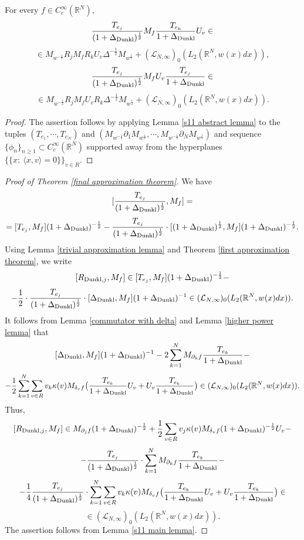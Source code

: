 \documentclass{amsart}
\begin{document}
\begin{lemma}\label{s11 main lemma} For every $f\in C^{\infty}_c(\mathbb{R}^N),$
$$\frac{T_{e_j}}{(1+\Delta_{{\rm Dunkl}})^{\frac12}}M_f\frac{T_{e_k}}{1+\Delta_{{\rm Dunkl}}}U_v\in$$
$$\in M_{w^{-\frac12}}R_jM_fR_kU_v\Delta^{-\frac12}M_{w^{\frac12}}+(\mathcal{L}_{N,\infty})_0(L_2(\mathbb{R}^N,w(x)dx)),$$
$$\frac{T_{e_j}}{(1+\Delta_{{\rm Dunkl}})^{\frac12}}M_fU_v\frac{T_{e_j}}{1+\Delta_{{\rm Dunkl}}}\in $$
$$\in M_{w^{-\frac12}}R_jM_fU_vR_k\Delta^{-\frac12}M_{w^{\frac12}}+(\mathcal{L}_{N,\infty})_0(L_2(\mathbb{R}^N,w(x)dx)).$$
\end{lemma}
\begin{proof} The assertion follows by applying Lemma \ref{s11 abstract lemma} to the tuples $(T_{e_1},\cdots,T_{e_N})$ and $(M_{w^{-\frac12}}\partial_1M_{w^{\frac12}},\cdots,M_{w^{-\frac12}}\partial_NM_{w^{\frac12}})$ and sequence $\{\phi_n\}_{n\geq1}\subset C^{\infty}_c(\mathbb{R}^N)$ supported away from the hyperplanes $\{\{x:\ \langle x,v\rangle=0\}\}_{v\in R}.$
\end{proof}



\begin{proof}[Proof of Theorem \ref{final approximation theorem}] We have
$$[\frac{T_{e_j}}{(1+\Delta_{{\rm Dunkl}})^{\frac12}},M_f]=$$
$$=[T_{e_j},M_f](1+\Delta_{{\rm Dunkl}})^{-\frac12}-\frac{T_{e_j}}{(1+\Delta_{{\rm Dunkl}})^{\frac12}}\cdot [(1+\Delta_{{\rm Dunkl}})^{\frac12},M_f](1+\Delta_{{\rm Dunkl}})^{-\frac12}.$$
Using Lemma \ref{trivial approximation lemma} and Theorem \ref{first approximation theorem}, we write
$$[R_{{\rm Dunkl},j},M_f]\in [T_{e_j},M_f](1+\Delta_{{\rm Dunkl}})^{-\frac12}-$$
$$-\frac12\cdot\frac{T_{e_j}}{(1+\Delta_{{\rm Dunkl}})^{\frac12}}\cdot [\Delta_{{\rm Dunkl}},M_f](1+\Delta_{{\rm Dunkl}})^{-1}\in(\mathcal{L}_{N,\infty})_0(L_2(\mathbb{R}^N,w(x)dx)).$$
It follows from Lemma \ref{commutator with delta} and Lemma \ref{higher power lemma} that
$$[\Delta_{{\rm Dunkl}},M_f](1+\Delta_{{\rm Dunkl}})^{-1}-2\sum_{k=1}^NM_{\partial_kf}\frac{T_{e_k}}{1+\Delta_{{\rm Dunkl}}}-$$
$$-\frac12\sum_{k=1}^N\sum_{v\in R}v_k\kappa(v)M_{\delta_vf}\big(\frac{T_{e_k}}{1+\Delta_{{\rm Dunkl}}}U_v+U_v\frac{T_{e_k}}{1+\Delta_{{\rm Dunkl}}}\big)\in (\mathcal{L}_{N,\infty})_0(L_2(\mathbb{R}^N,w(x)dx)).$$
Thus,
$$[R_{{\rm Dunkl},j},M_f]\in M_{\partial_jf}(1+\Delta_{{\rm Dunkl}})^{-\frac12}+\frac12\sum_{v\in R}v_j\kappa(v)M_{\delta_vf}(1+\Delta_{{\rm Dunkl}})^{-\frac12}U_v-$$
$$-\frac{T_{e_j}}{(1+\Delta_{{\rm Dunkl}})^{\frac12}}\cdot \sum_{k=1}^NM_{\partial_kf}\frac{T_{e_k}}{1+\Delta_{{\rm Dunkl}}}-$$
$$-\frac14\frac{T_{e_j}}{(1+\Delta_{{\rm Dunkl}})^{\frac12}}\cdot\sum_{k=1}^N\sum_{v\in R}v_k\kappa(v)M_{\delta_vf}\big(\frac{T_{e_k}}{1+\Delta_{{\rm Dunkl}}}U_v+U_v\frac{T_{e_k}}{1+\Delta_{{\rm Dunkl}}}\big)\in$$
$$\in(\mathcal{L}_{N,\infty})_0(L_2(\mathbb{R}^N,w(x)dx)).$$
The assertion follows from Lemma \ref{s11 main lemma}.
\end{proof}
\end{document}
